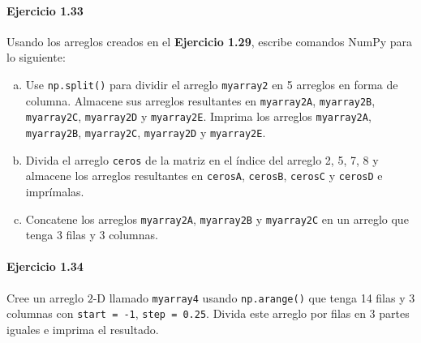 \paragraph{\color{DarkBlue}Ejercicio 1.33}
Usando los arreglos creados en el
\textbf{\color{DarkBlue}Ejercicio 1.29}, escribe comandos NumPy para
lo siguiente:

\begin{enumerate}[(a)]
	\item

	      Use \texttt{np.split()} para dividir el arreglo
	      \texttt{myarray2} en 5 arreglos en forma de
	      columna.
	      Almacene sus arreglos resultantes en
	      \texttt{myarray2A},
	      \texttt{myarray2B},
	      \texttt{myarray2C},
	      \texttt{myarray2D} y
	      \texttt{myarray2E}.
	      Imprima los arreglos \texttt{myarray2A},
	      \texttt{myarray2B},
	      \texttt{myarray2C},
	      \texttt{myarray2D} y
	      \texttt{myarray2E}.

	\item

	      Divida el arreglo \texttt{ceros} de la matriz
	      en el índice del arreglo 2, 5, 7, 8 y almacene los arreglos
	      resultantes en \texttt{cerosA},
	      \texttt{cerosB}, \texttt{cerosC} y
	      \texttt{cerosD} e imprímalas.

	\item

	      Concatene los arreglos \texttt{myarray2A},
	      \texttt{myarray2B} y
	      \texttt{myarray2C} en un arreglo que tenga 3
	      filas y 3 columnas.
\end{enumerate}

\paragraph{\color{DarkBlue}Ejercicio 1.34}

Cree un arreglo $2$-D llamado \texttt{myarray4} usando
\texttt{np.arange()} que tenga 14 filas y 3 columnas con
\texttt{start = -1}, \texttt{step = 0.25}.
Divida este arreglo por filas en 3 partes iguales e imprima el
resultado.


